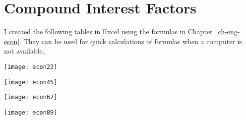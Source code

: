 \chapter{Compound Interest Factors}\label{ch-econ-tables}
I created the following tables in Excel using the formulas in Chapter~\ref{ch-eng-econ}.  They can be used for quick calculations of formulas when a computer is not available.


\pagebreak

\noindent
\texttt{[image: econ23]}

\texttt{[image: econ45]}

\texttt{[image: econ67]}

\texttt{[image: econ89]}
